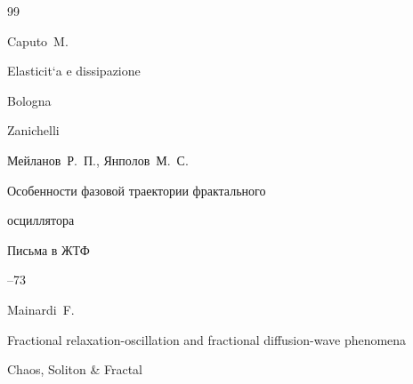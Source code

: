 \begin{thebibliography}{99}












\by Caputo~M. 

\book Elasticit`a e dissipazione

\publaddr Bologna

\publ Zanichelli






\by Мейланов~Р.~П., Янполов~М.~С. 

\paper Особенности фазовой траектории фрактального

осциллятора

\jour Письма в ЖТФ




--73













\by Mainardi~F. 

\paper Fractional relaxation-oscillation and fractional diffusion-wave phenomena

\jour Chaos, Soliton \& Fractal



\end{thebibliography}
